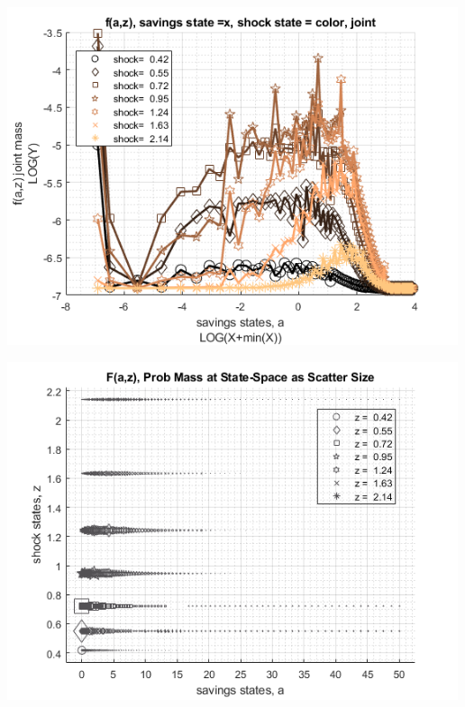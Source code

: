 \documentclass[
]{book}
\begin{document}
\includegraphics[width=5.20833in,height=\textheight]{img/fx_ds_az_loop_images/figure_5.png}

\includegraphics[width=5.20833in,height=\textheight]{img/fx_ds_az_loop_images/figure_6.png}
\end{document}
